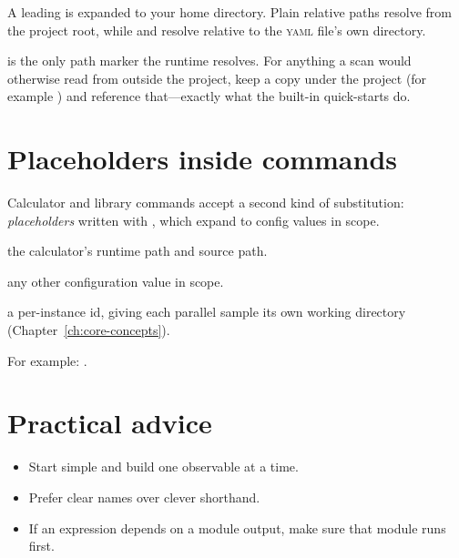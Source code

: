 \noindent A leading \code{\textasciitilde} is expanded to your home directory. Plain relative
paths resolve from the project root, while  and  resolve relative to the
\textsc{yaml} file's own directory.

\begin{jnote}
 is the only path marker the runtime resolves. For anything a scan would otherwise
read from outside the project, keep a copy under the project (for example )
and reference that---exactly what the built-in quick-starts do.
\end{jnote}

\section{Placeholders inside commands}
\label{sec:expr-placeholders}

Calculator and library commands accept a second kind of substitution: \emph{placeholders} written
with , which expand to config values in scope.

\begin{description}[style=nextline, leftmargin=1.2em]
  \item[\code{\$\{path\}}, \code{\$\{source\}}] the calculator's runtime path and source path.
  \item[\code{\$\{...\}}] any other configuration value in scope.
  \item[\token{@PackID}] a per-instance id, giving each parallel sample its own working directory
        (Chapter~\ref{ch:core-concepts}).
\end{description}

\noindent For example: .

\section{Practical advice}
\label{sec:expr-advice}

\begin{itemize}
  \item Start simple and build one observable at a time.
  \item Prefer clear names over clever shorthand.
  \item If an expression depends on a module output, make sure that module runs first.
\end{itemize}
